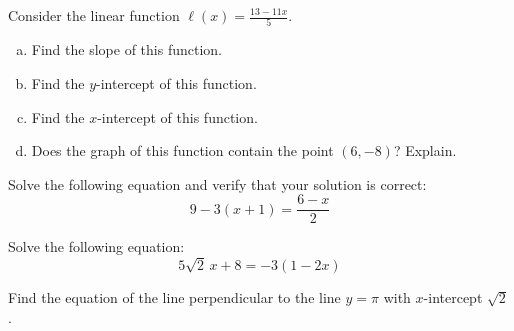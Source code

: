 \documentclass[11pt,letterpaper]{article}
\begin{document}

 Consider the linear function $\ell(x)= \frac{13 - 11x}{5}$. 
	\begin{enumerate}[(a)]
	\item Find the slope of this function.
	\item Find the $y$-intercept of this function.
	\item Find the $x$-intercept of this function.
	\item Does the graph of this function contain the point $(6, -8)$? Explain. 
	\end{enumerate}



\newpage



 Solve the following equation and verify that your solution is correct:
	\[
	9 - 3(x + 1)= \dfrac{6 - x}{2}
	\]



\newpage



 Solve the following equation:
	\[
	5\sqrt{2}\, x + 8= -3(1 - 2x)
	\] 



\newpage



 Find the equation of the line perpendicular to the line $y= \pi$ with $x$-intercept $\sqrt{2}$. 
\end{document}
